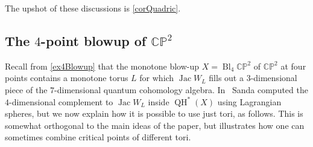 \documentclass[JEP,XML,SOM,Unicode,NoEqCountersInSection,NoFloatCountersInSection,published]{cedram}
\theoremstyle{definition}
\newcommand{\CC}{\mathbb{C}}
\newcommand{\PP}{\mathbb{P}}
\newcommand{\QH}{\operatorname{QH}}
\newcommand{\Jac}{\operatorname{Jac}}
\begin{document}
The upshot of these discussions is \cref{corQuadric}.

\subsection{The $4$-point blowup of $\CC\PP^2$}

Recall from \cref{ex4Blowup} that the monotone blow-up $X = \operatorname{Bl}_4 \CC\PP^2$ of $\CC\PP^2$ at four points contains a monotone torus $L$ for which $\Jac W_L$ fills out a $3$-dimensional piece of the $7$-dimensional quantum cohomology algebra. In~\cite{Sanda} Sanda computed the $4$-dimensional complement to $\Jac W_L$ inside $\QH^*(X)$ using Lagrangian spheres, but we now explain how it is possible to use just tori, as follows. This is somewhat orthogonal to the main ideas of the paper, but illustrates how one can sometimes combine critical points of different tori.
\end{document}
